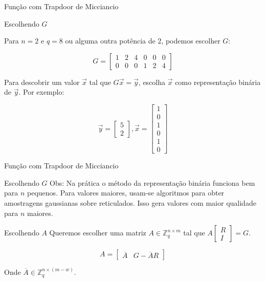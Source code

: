 \documentclass{beamer}
\begin{document}
\begin{frame}{Função com Trapdoor de Micciancio}
\begin{block}{Escolhendo $G$}

Para $n=2$ e $q=8$ ou alguma outra potência de 2, podemos escolher $G$:
 
 $$ G = \begin{bmatrix}1 & 2 & 4 & 0 & 0 & 0\\0 & 0 & 0 & 1 & 2&
   4\end{bmatrix}
 $$
 
Para descobrir um valor $\overrightarrow{x}$ tal que
$G\overrightarrow{x}=\overrightarrow{y}$, escolha
$\overrightarrow{x}$ como representação binária de
$\overrightarrow{y}$. Por exemplo:

$$
\overrightarrow{y}=\begin{bmatrix}5\\2\end{bmatrix},
\overrightarrow{x}=\begin{bmatrix}1\\0\\1\\0\\1\\0\end{bmatrix}
$$
\end{block}
    
\end{frame}

\begin{frame}{Função com Trapdoor de Micciancio}
    \begin{block}{Escolhendo $G$}
     Obs: Na prática o método da representação binária funciona bem para $n$ pequenos. Para valores maiores, usam-se algoritmos para obter amostragens gaussianas sobre reticulados. Isso gera valores com maior qualidade para $n$ maiores.
    \end{block}
    
    \begin{block}{Escolhendo $A$}
     Queremos escolher uma matriz $A \in \mathbb{Z}_q^{n \times m}$ tal que $A\begin{bmatrix}R\\I\end{bmatrix} = G$.

    $$
     A = \begin{bmatrix}\overline{A} & G-\overline{A}R\end{bmatrix}
    $$

    Onde $\overline{A} \in \mathbb{Z}_q^{n \times (m-w)}$.
    \end{block}
\end{frame}
\end{document}
